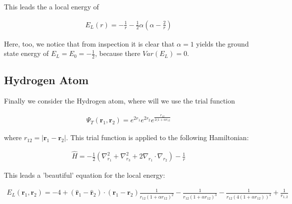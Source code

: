 This leads the a local energy of

  \begin{align}
    E_L(r) = - \frac{1}{r} - \frac{1}{2}\alpha(\alpha - \frac{2}{r})
  \end{align}
  
Here, too, we notice that from inspection it is clear that $\alpha = 1$ yields the ground state energy of $E_L = E_0 = -\frac{1}{2}$, because there $Var(E_L) = 0$. 

\subsection{Hydrogen Atom}
Finally we consider the Hydrogen atom, where will we use the trial function 

  \begin{align}
    \Psi_T (\textbf{r}_1,\textbf{r}_2) = e^{2r_1}e^{2r_2}e^{\frac{r_{12}}{2(1+\alpha r_{12}}} 
  \end{align}

where $r_{12} = |\textbf{r}_1 - \textbf{r}_2 |$. This trial function is applied to the following Hamiltonian:
  
  \begin{align}
    \hat{H} = -\frac{1}{2}(\nabla_{r_1}^2 + \nabla_{r_3}^2 + 2\nabla_{r_1}\cdot \nabla_{r_2}) - \frac{1}{r}
  \end{align}
  
This leads a 'beautiful' equation for the local energy:

  \begin{align}
    E_L(\textbf{r}_1,\textbf{r}_2) = -4  + (\hat{\textbf{r}}_1 - \hat{\textbf{r}}_2) \cdot (\textbf{r}_1 - \textbf{r}_2) \frac{1}{r_{12}(1+\alpha r_{12})^2} -  \frac{1}{r_{12}(1+\alpha r_{12})^3} - \frac{1}{r_{12}(4(1+\alpha r_{12}))^4} + \frac{1}{r_{1,2}}   \end{align}
  
